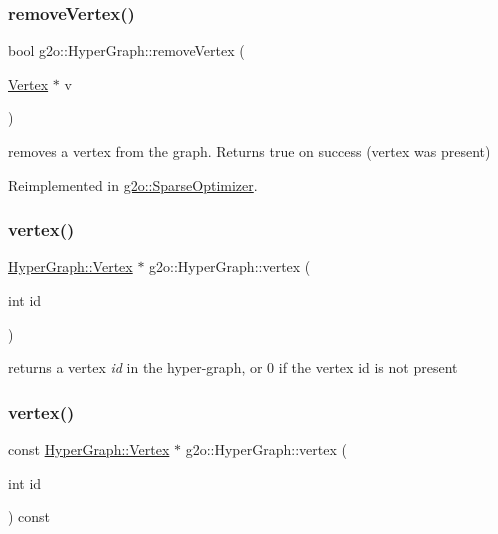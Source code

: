 \subsubsection{\texorpdfstring{remove\+Vertex()}{removeVertex()}}
{\footnotesize\ttfamily bool g2o\+::\+Hyper\+Graph\+::remove\+Vertex (\begin{DoxyParamCaption}\item[{\mbox{\hyperlink{classg2o_1_1_hyper_graph_1_1_vertex}{Vertex}} $\ast$}]{v }\end{DoxyParamCaption})\hspace{0.3cm}{\ttfamily [virtual]}}



removes a vertex from the graph. Returns true on success (vertex was present) 



Reimplemented in \mbox{\hyperlink{classg2o_1_1_sparse_optimizer_a0fb2a5e2b250bf2530a600f6dcaad03f}{g2o\+::\+Sparse\+Optimizer}}.

\mbox{\label{classg2o_1_1_hyper_graph_ab07fe8bd9982a66ba34e83dff8317ea2}} 
\subsubsection{\texorpdfstring{vertex()}{vertex()}\hspace{0.1cm}{\footnotesize\ttfamily [1/2]}}
{\footnotesize\ttfamily \mbox{\hyperlink{classg2o_1_1_hyper_graph_1_1_vertex}{Hyper\+Graph\+::\+Vertex}} $\ast$ g2o\+::\+Hyper\+Graph\+::vertex (\begin{DoxyParamCaption}\item[{int}]{id }\end{DoxyParamCaption})}



returns a vertex {\itshape id} in the hyper-\/graph, or 0 if the vertex id is not present 

\mbox{\label{classg2o_1_1_hyper_graph_ac117806d17a7e7ad7f8db42f2864cac9}} 
\subsubsection{\texorpdfstring{vertex()}{vertex()}\hspace{0.1cm}{\footnotesize\ttfamily [2/2]}}
{\footnotesize\ttfamily const \mbox{\hyperlink{classg2o_1_1_hyper_graph_1_1_vertex}{Hyper\+Graph\+::\+Vertex}} $\ast$ g2o\+::\+Hyper\+Graph\+::vertex (\begin{DoxyParamCaption}\item[{int}]{id }\end{DoxyParamCaption}) const}



